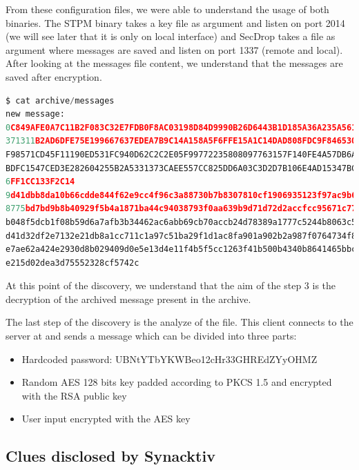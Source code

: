 \documentclass[a4paper]{article}
\begin{document}
From these configuration files, we were able to understand the usage of both binaries. The STPM binary takes a key file as argument and listen on port 2014 (we will see later that it is only on local interface) and SecDrop takes a file as argument where messages are saved and listen on port 1337 (remote and local). After looking at the messages file content, we understand that the messages are saved after encryption.
\newpage
\begin{lstlisting}[language=python,caption={File messages},numbers=none,style=colortilde]
$ cat archive/messages 
new message:
0C849AFE0A7C11B2F083C32E7FDB0F8AC03198D84D9990B26D6443B1D185A36A235A561BB99FE897858
371311B2AD6DFE75E199667637EDEA7B9C14A158A5F6FFE15A1C14DAD808FDC9F846530EDD4FE3E86F4
F98571CD45F11190ED531FC940D62C2C2E05F99772235808097763157F140FE4A57DB6AD902D9962F12
BDFC1547CED3E282604255B2A5331373CAEE557CC825DD6A03C3D2D7B106E4AD15347BCB5067BDC6037
6FF1CC133F2C14 
9d41dbb8da10b66cdde844f62e9cc4f96c3a88730b7b8307810cf1906935123f97ac9b682dd401512d1
8775bd7bd9b8b40929f5b4a1871ba44c94038793f0aa639b9d71d72d2accfcc95671c77a5c1c32bc813
b048f5dcb1f08b59d6a7afb3b34462ac6abb69cb70accb24d78389a1777c5244b8063c542cc1f6c6db8
d41d32df2e7132e21db8a1cc711c1a97c51ba29f1d1ac8fa901a902b2a987f0764734f8b8cd2d476200
e7ae62a424e2930d8b029409d0e5e13d4e11f4b5f5cc1263f41b500b4340b8641465bbc56c64a575f0e
e215d02dea3d75552328cf5742c 
\end{lstlisting}

At this point of the discovery, we understand that the aim of the step 3 is the decryption of the archived message present in the archive.
\newline

The last step of the discovery is the analyze of the  file. This client connects to the server at  and sends a message which can be divided into three parts:
\begin{itemize}
\item Hardcoded password: UBNtYTbYKWBeo12cHr33GHREdZYyOHMZ
\item Random AES 128 bits key padded according to PKCS 1.5 and encrypted with the RSA public key
\item User input encrypted with the AES key
\end{itemize}




\subsection{Clues disclosed by Synacktiv}
\end{document}
